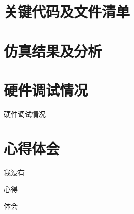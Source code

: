 \documentclass{article}
\begin{document}
    \section{关键代码及文件清单}

    \section{仿真结果及分析}

    \section{硬件调试情况}
        硬件调试情况

    \section{心得体会}

        \begin{enumerate}
            \begin{item}
                我没有
            \end{item}
            \begin{item}
                心得
            \end{item}
            \begin{item}
                体会
            \end{item}
        \end{enumerate}
\end{document}

